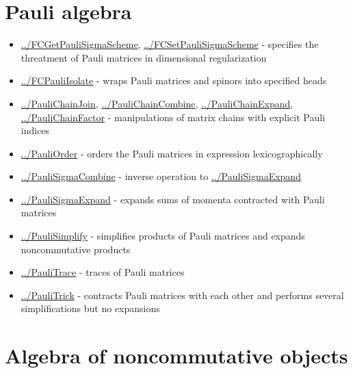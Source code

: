\documentclass[../FeynCalcManual.tex]{subfiles}
\begin{document}
\hypertarget{pauli algebra}{
\section{Pauli algebra}\label{pauli algebra}}

\begin{itemize}
\tightlist
\item
  \hyperlink{../fcgetpaulisigmascheme}{../FCGetPauliSigmaScheme},
  \hyperlink{../fcsetpaulisigmascheme}{../FCSetPauliSigmaScheme} -
  specifies the threatment of Pauli matrices in dimensional
  regularization
\item
  \hyperlink{../fcpauliisolate}{../FCPauliIsolate} - wraps Pauli
  matrices and spinors into specified heads
\item
  \hyperlink{../paulichainjoin}{../PauliChainJoin},
  \hyperlink{../paulichaincombine}{../PauliChainCombine},
  \hyperlink{../paulichainexpand}{../PauliChainExpand},
  \hyperlink{../paulichainfactor}{../PauliChainFactor} - manipulations
  of matrix chains with explicit Pauli indices
\item
  \hyperlink{../pauliorder}{../PauliOrder} - orders the Pauli matrices
  in expression lexicographically
\item
  \hyperlink{../paulisigmacombine}{../PauliSigmaCombine} - inverse
  operation to \hyperlink{../paulisigmaexpand}{../PauliSigmaExpand}
\item
  \hyperlink{../paulisigmaexpand}{../PauliSigmaExpand} - expands sums of
  momenta contracted with Pauli matrices
\item
  \hyperlink{../paulisimplify}{../PauliSimplify} - simplifies products
  of Pauli matrices and expands noncommutative products
\item
  \hyperlink{../paulitrace}{../PauliTrace} - traces of Pauli matrices
\item
  \hyperlink{../paulitrick}{../PauliTrick} - contracts Pauli matrices
  with each other and performs several simplifications but no expansions
\end{itemize}

\hypertarget{algebra of noncommutative objects}{
\section{Algebra of noncommutative objects}\label{algebra of noncommutative objects}}
\end{document}
